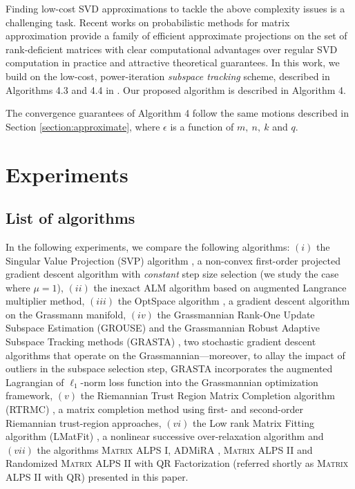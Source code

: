 \documentclass[twocolumn]{svjour3}
\newcommand{\rank}{k}
\begin{document}
Finding low-cost SVD approximations to tackle the above complexity issues is a challenging task. Recent works on probabilistic methods for matrix approximation \cite{findingstructure} provide a family of efficient approximate projections on the set of rank-deficient matrices with clear computational advantages over regular SVD computation in practice and attractive theoretical guarantees. In this work, we build on the low-cost, power-iteration {\it subspace tracking} scheme, described in Algorithms 4.3 and 4.4 in \cite{findingstructure}. Our proposed algorithm is described in Algorithm 4.

The convergence guarantees of Algorithm 4 follow the same motions described in Section \ref{section:approximate}, where $\epsilon $ is a function of $m, ~n, ~\rank $ and $ q $. 

\section{Experiments}{\label{section:experiments}}

\subsection{List of algorithms}
In the following experiments, we compare the following algorithms: $(i)$ the Singular Value Projection (SVP) algorithm \cite{SVP}, a non-convex first-order projected gradient descent algorithm with {\it constant} step size selection (we study the case where $\mu = 1 $), $(ii)$ the inexact ALM algorithm \cite{ALM} based on augmented Langrance multiplier method, $(iii)$ the OptSpace algorithm \cite{OptSpace}, a gradient descent algorithm on the Grassmann manifold, $(iv)$ the Grassmannian Rank-One Update Subspace Estimation (GROUSE) and the Grassmannian Robust Adaptive Subspace Tracking methods (GRASTA) \cite{GROUSE, GRASTA}, two stochastic gradient descent algorithms that operate on the Grassmannian---moreover, to allay the impact of outliers in the subspace selection step, GRASTA incorporates the augmented Lagrangian of $\ell_1$-norm loss function into the Grassmannian optimization framework, $(v)$ the Riemannian Trust Region Matrix Completion algorithm (RTRMC) \cite{RTRMC}, a matrix completion method using first- and second-order Riemannian trust-region approaches, $(vi)$ the Low rank Matrix Fitting algorithm (LMatFit) \cite{LMatFit}, a nonlinear successive over-relaxation algorithm and $(vii)$ the algorithms \textsc{Matrix ALPS I}, ADMiRA \cite{admira2010}, \textsc{Matrix ALPS II} and Randomized \textsc{Matrix ALPS II} with QR Factorization (referred shortly as \textsc{Matrix ALPS II} with QR) presented in this paper.
\end{document}
